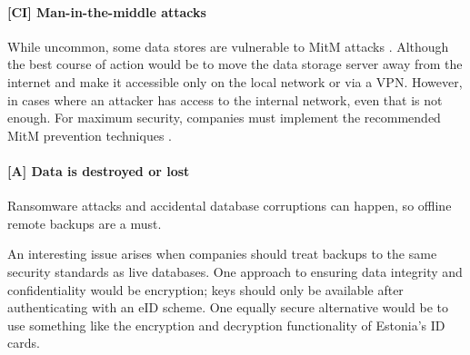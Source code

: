 \paragraph{[CI] Man-in-the-middle attacks} While uncommon, some data stores are vulnerable to MitM attacks \cite{sql-server-auth-mitm}. Although the best course of action would be to move the data storage server away from the internet and make it accessible only on the local network or via a VPN. However, in cases where an attacker has access to the internal network, even that is not enough. For maximum security, companies must implement the recommended MitM prevention techniques \cite{sql-server-enable-tls}.

\paragraph{[A] Data is destroyed or lost}

Ransomware attacks and accidental database corruptions can happen, so offline remote backups are a must.

An interesting issue arises when companies should treat backups to the same security standards as live databases. One approach to ensuring data integrity and confidentiality would be encryption; keys should only be available after authenticating with an eID scheme. One equally secure alternative would be to use something like the encryption and decryption functionality of Estonia's ID cards.